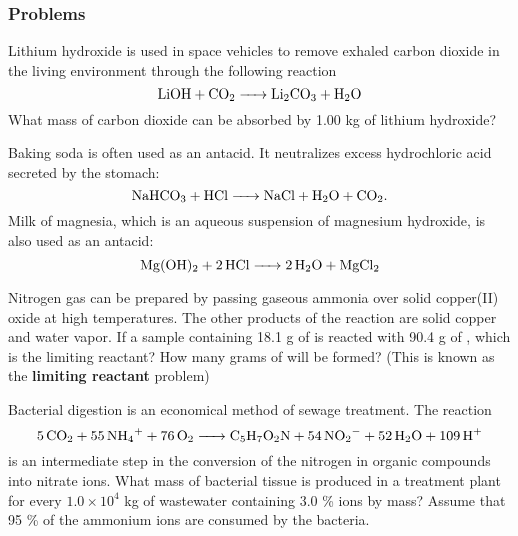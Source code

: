     \subsubsection{Problems}
    \begin{problem}
    Lithium hydroxide is used in space vehicles to remove exhaled carbon dioxide in the living environment through the following reaction
    $$\ce{LiOH + CO2 -> Li2CO3 + H2O}$$
    What mass of carbon dioxide can be absorbed by 1.00 kg of lithium hydroxide?
    \end{problem}
    \begin{problem}
    Baking soda is often used as an antacid. It neutralizes excess hydrochloric acid secreted by the stomach:
    $$\ce{NaHCO3 + HCl -> NaCl + H2O + CO2}.$$
    Milk of magnesia, which is an aqueous suspension of magnesium hydroxide, is also used as an antacid:
    $$\ce{Mg(OH)2 + 2HCl -> 2H2O + MgCl2}$$
    \end{problem}
    \begin{problem}
    Nitrogen gas can be prepared by passing gaseous ammonia over solid copper(II) oxide at high temperatures. The other products of the reaction are solid copper and water vapor. If a sample containing 18.1 g of  is reacted with 90.4 g of , which is the limiting reactant? How many grams of  will be formed? (This is known as the \textbf{limiting reactant} problem)
    \end{problem} 
    \begin{problem}
    Bacterial digestion is an economical method of sewage treatment. The reaction
    $$\ce{5CO2 + 55NH4+ + 76O2 -> C5H7O2N + 54NO2- + 52H2O + 109H+}$$
    is an intermediate step in the conversion of the nitrogen in organic compounds into nitrate ions. What mass of bacterial tissue is produced in a treatment plant for every $1.0 \times 10^4$ kg of wastewater containing 3.0 \%  ions by mass? Assume that 95 \% of the ammonium ions are consumed by the bacteria.
    \end{problem} 